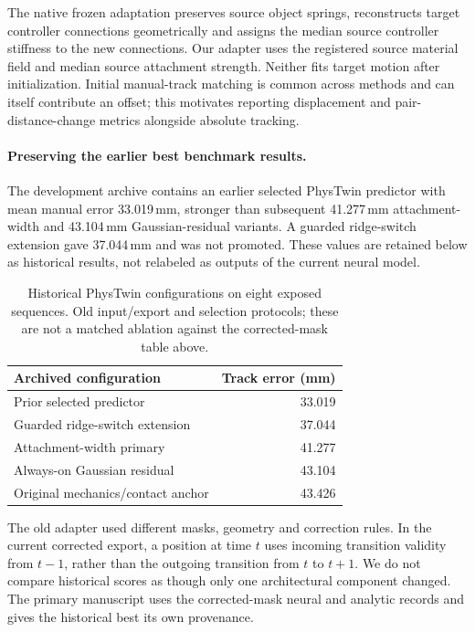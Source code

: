 \documentclass[10pt,twocolumn,letterpaper]{article}
\begin{document}
The native frozen adaptation preserves source object springs, reconstructs target controller connections geometrically and assigns the median source controller stiffness to the new connections. Our adapter uses the registered source material field and median source attachment strength. Neither fits target motion after initialization. Initial manual-track matching is common across methods and can itself contribute an offset; this motivates reporting displacement and pair-distance-change metrics alongside absolute tracking.

\paragraph{Preserving the earlier best benchmark results.}
The development archive contains an earlier selected PhysTwin predictor with mean manual error 33.019\,mm, stronger than subsequent 41.277\,mm attachment-width and 43.104\,mm Gaussian-residual variants. A guarded ridge-switch extension gave 37.044\,mm and was not promoted. These values are retained below as historical results, not relabeled as outputs of the current neural model.

\begin{table}[h]
\centering\small\setlength{\tabcolsep}{3pt}
\caption{Historical PhysTwin configurations on eight exposed sequences. Old input/export and selection protocols; these are not a matched ablation against the corrected-mask table above.}
\begin{tabular}{lr}\toprule
Archived configuration & Track error (mm)\\\midrule
Prior selected predictor &33.019\\
Guarded ridge-switch extension &37.044\\
Attachment-width primary &41.277\\
Always-on Gaussian residual &43.104\\
Original mechanics/contact anchor &43.426\\\bottomrule
\end{tabular}
\end{table}

The old adapter used different masks, geometry and correction rules. In the current corrected export, a position at time $t$ uses incoming transition validity from $t-1$, rather than the outgoing transition from $t$ to $t+1$. We do not compare historical scores as though only one architectural component changed. The primary manuscript uses the corrected-mask neural and analytic records and gives the historical best its own provenance.
\end{document}
